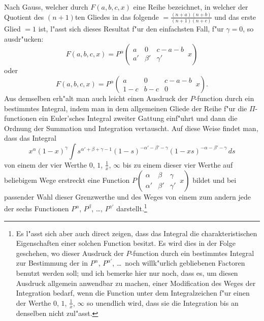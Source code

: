 \documentclass[12pt,a4paper]{book}
\theoremstyle{definition}
\theoremstyle{remark}
\begin{document}
Nach Gauss, welcher durch $F(a, b, c, x)$ eine Reihe bezeichnet, in welcher der Quotient des $(n + 1)$ten Gliedes in das folgende $= \frac{(n + a)(n + b)}{(n + 1)(n + c)}$ und das erste Glied $= 1$ ist, l{"a}sst sich dieses Resultat f{"u}r den einfachsten Fall, f{"u}r $\gamma = 0$, so ausdr{"u}cken:
\[
F(a, b, c, x) = P^{\alpha} \left(\begin{array}{ccc|} a & 0 & c - a - b \\ a' & \beta' & \gamma' \end{array}\, x\right)
\]
oder
\[
F(a, b, c, x) = P^{\alpha} \left(\begin{array}{ccc|} a & 0 & c - a - b \\ 1 - c & b - c & 0 \end{array}\, x\right).
\]
Aus demselben erh{"a}lt man auch leicht einen Ausdruck der $P$-function durch ein bestimmtes Integral, indem man in dem allgemeinen Gliede der Reihe f{"u}r die $\Pi$-functionen ein Euler'sches Integral zweiter Gattung einf{"u}hrt und dann die Ordnung der Summation und Integration vertauscht. Auf diese Weise findet man, dass das Integral
\[
x^{\alpha} (1 - x)^{\gamma} \int s^{\alpha' + \beta + \gamma - 1} (1 - s)^{-\alpha' - \beta' - \gamma} (1 - xs)^{-\alpha - \beta' - \gamma} \, ds
\]
von einem der vier Werthe $0$, $1$, $\frac{1}{x}$, $\infty$ bis zu einem dieser vier Werthe auf beliebigem Wege erstreckt eine Function $P\left(\begin{array}{ccc|} \alpha & \beta & \gamma \\ \alpha' & \beta' & \gamma' \end{array}\, x\right)$ bildet und bei passender Wahl dieser Grenzwerthe und des Weges von einem zum andern jede der sechs Functionen $P^{\alpha}$, $P^{\beta}$, \dots, $P^{\gamma'}$ darstellt.\footnote{Es l{"a}sst sich aber auch direct zeigen, dass das Integral die charakteristischen Eigenschaften einer solchen Function besitzt. Es wird dies in der Folge geschehen, wo dieser Ausdruck der $P$-function durch ein bestimmtes Integral zur Bestimmung der in $P^{\alpha}$, $P^{\alpha'}$, \dots\ noch willk{"u}rlich gebliebenen Factoren benutzt werden soll; und ich bemerke hier nur noch, dass es, um diesen Ausdruck allgemein anwendbar zu machen, einer Modification des Weges der Integration bedarf, wenn die Function unter dem Integralzeichen f{"u}r einen der Werthe $0$, $1$, $\frac{1}{x}$, $\infty$ so unendlich wird, dass sie die Integration bis an denselben nicht zul{"a}sst.}
\end{document}
